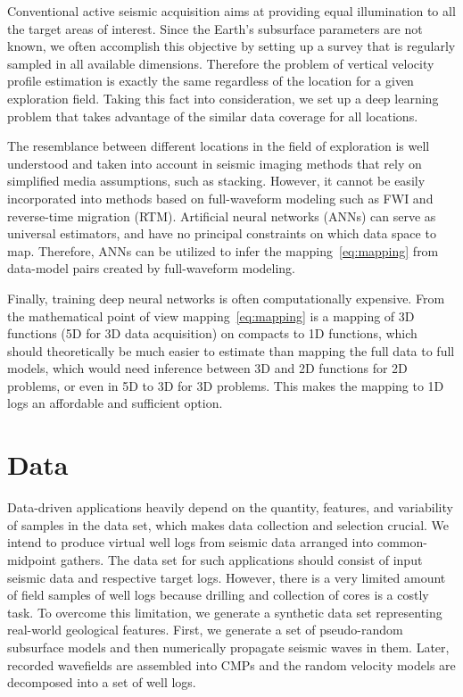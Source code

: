 \documentclass[paper,twocolomn]{geophysics}
\begin{document}
Conventional active seismic acquisition aims at providing equal illumination to all the target areas of interest. Since the Earth's subsurface parameters are not known, we often accomplish this objective by setting up a survey that is regularly sampled in all available dimensions. Therefore the problem of vertical velocity profile estimation is exactly the same regardless of the location for a given exploration field. Taking this fact into consideration, we set up a deep learning problem that takes advantage of the similar data coverage for all locations. 

The resemblance between different locations in the field of exploration is well understood and taken into account in seismic imaging methods that rely on simplified media assumptions, such as stacking. However, it cannot be easily incorporated into methods based on full-waveform modeling such as FWI and reverse-time migration (RTM).   
%
Artificial neural networks (ANNs) can serve as universal estimators, and have no principal constraints on which data space to map. Therefore, ANNs can be utilized to infer the mapping~\eqref{eq:mapping} from data-model pairs created by full-waveform modeling. 

Finally, training deep neural networks is often computationally expensive. From the mathematical point of view mapping~\eqref{eq:mapping} is a mapping of 3D functions (5D for 3D data acquisition) on compacts to 1D functions, which should theoretically be much easier to estimate than mapping the full data to full models, which would need inference between 3D and 2D functions for 2D problems, or even in 5D to 3D for 3D problems. This makes the mapping to 1D logs an affordable and sufficient option.


\section{Data}
Data-driven applications heavily depend on the quantity, features, and variability of samples in the data set, which makes data collection and selection crucial. 
%
We intend to produce virtual well logs from seismic data arranged into common-midpoint gathers. The data set for such applications should consist of input seismic data and respective target logs. However, there is a very limited amount of field samples of well logs because drilling and collection of cores is a costly task. 
%
To overcome this limitation, we generate a synthetic data set representing real-world geological features. First, we generate a set of pseudo-random subsurface models and then numerically propagate seismic waves in them. Later, recorded wavefields are assembled into CMPs and the random velocity models are decomposed into a set of well logs.
\end{document}
